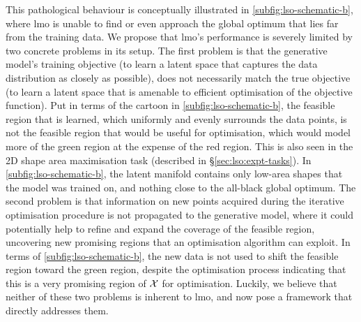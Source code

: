 This pathological behaviour is conceptually illustrated in \cref{subfig:lso-schematic-b},
where \gls{lmo} is unable to find or even approach the global optimum that lies far from the training data.
We propose that \gls{lmo}'s performance is severely limited by two concrete problems in its setup.
The first problem is that the generative model's training objective (to learn a latent space that captures the data distribution as closely as possible),
does not necessarily match the true objective (to learn a latent space that is amenable to efficient optimisation of the objective function).
Put in terms of the cartoon in \cref{subfig:lso-schematic-b}, the feasible region that is learned, which uniformly and evenly surrounds the data points,
is not the feasible region that would be useful for optimisation,
which would model more of the green region at the expense of the red region.
This is also seen in the 2D shape area maximisation task (described in \S\ref{sec:lso:expt-tasks}).
In \cref{subfig:lso-schematic-b},
the latent manifold contains only low-area shapes that the model was trained on,
and nothing close to the all-black global optimum.
The second problem is that information on new points acquired during the iterative optimisation procedure
is not propagated to the generative model,
where it could potentially help to refine and expand the coverage of the feasible region,
uncovering new promising regions that an optimisation algorithm can exploit.
In terms of \cref{subfig:lso-schematic-b},
the new data is not used to shift the feasible region toward the green region, despite the optimisation process indicating that this is a very promising region of $\mathcal{X}$ for optimisation.
Luckily, we believe that neither of these two problems is inherent to \gls{lmo}, and now pose a framework that directly addresses them.
